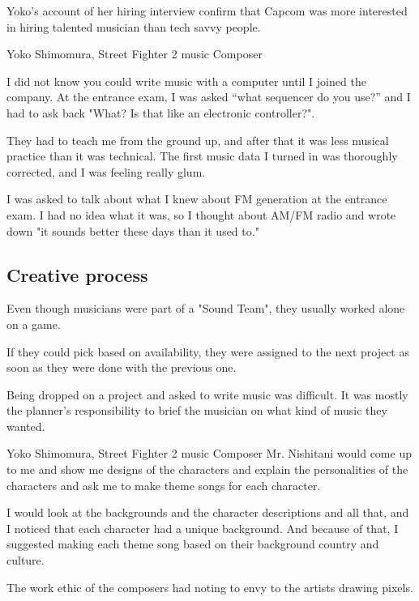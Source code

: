 Yoko's account of her hiring interview confirm that Capcom was more interested in hiring talented musician than tech savvy people.

\begin{q}{Yoko Shimomura, Street Fighter 2 music Composer\cite{beep199010}}
  
I did not know you could write music with a computer until I joined the company. At the entrance exam, I was asked “what sequencer do you use?” and I had to ask back "What? Is that like an electronic controller?".

They had to teach me from the ground up, and after that it was less musical practice than it was technical. The first music data I turned in was thoroughly corrected, and I was feeling really glum.

I was asked to talk about what I knew about FM generation at the entrance exam. I had no idea what it was, so I thought about AM/FM radio and wrote down "it sounds better these days than it used to."
\end{q}



\subsection{Creative process}
Even though musicians were part of a "Sound Team", they usually worked alone on a game. 

If they could pick based on availability\cite{sf2musics}, they were assigned to the next project as soon as they were done with the previous one.


Being dropped on a project and asked to write music was difficult. It was mostly the planner's responsibility to brief the musician on what kind of music they wanted\cite{sf2_music}.

\begin{q}{Yoko Shimomura, Street Fighter 2 music Composer\cite{sf2_oral_history}}
Mr. Nishitani would come up to me and show me designs of the characters and explain the personalities of the characters and ask me to make theme songs for each character.

I would look at the backgrounds and the character descriptions and all that, and I noticed that each character had a unique background. And because of that, I suggested making each theme song based on their background country and culture.
\end{q}

The work ethic of the composers had noting to envy to the artists drawing pixels.

